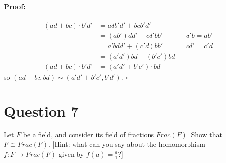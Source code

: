 \documentclass [12pt] {article}
\newenvironment{proof}{\paragraph{Proof:}}{\hfill$\square$}
\begin{document}
\begin{enumerate}
\begin{proof}
            \begin{align*}
                (ad + bc) \cdot b'd' &= adb'd' + bcb'd' \\
                                     &= (ab')dd' + cd'bb' && a'b = ab' \\
                                     &= a'bdd' + (c'd)bb' && cd' = c'd \\
                                     &= (a'd')bd + (b'c')bd \\
                (ad + bc) \cdot b'd' &= (a'd' + b'c') \cdot bd
            \end{align*}
            so $(ad + bc, bd) \sim (a'd' + b'c', b'd')$.
        \end{proof}
\end{enumerate}
\newpage


\section*{Question 7}
Let $F$ be a field, and consider its field of fractions $Frac(F)$. Show that $F\cong Frac(F)$.
[Hint: what can you say about the homomorphism $f:F\to Frac(F)$ given by $f(a)=\frac{a}{1}$?]
\end{document}
